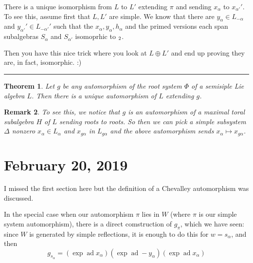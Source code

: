 \documentclass[12pt]{article}
\theoremstyle{nonumberbreak}
\theoremstyle{changebreak}
\newtheorem{thm}{Theorem}[subsection]
\theoremstyle{nonumberbreak}
\theoremstyle{change}
\newtheorem{rmk}[thm]{Remark}
\newcommand*{\brk}{
\rule{2in}{.1pt}
}
\let\sl\relax
\DeclareMathOperator{\sl}{\mathfrak{sl}}
\DeclareMathOperator{\ad}{ad}
\begin{document}
There is a unique isomorphism from $L$ to $L'$ extending $\pi$ and sending $x_\alpha$ to $x_{\alpha'}'$. To
see this, assume first that $L,L'$ are simple. We know that there are $y_\alpha\in L_{-\alpha}$ and 
$y_{\alpha'}'\in L_{-\alpha'}'$ such that the $x_\alpha,y_\alpha,h_\alpha$ and the primed 
versions each span subalgebras $S_\alpha$ and $S_{\alpha'}$ isomoprhic to $\sl_2$.

Then you have this nice trick where you look at $L\oplus L'$ and end up proving they are, in fact, isomorphic. :)

\brk

\begin{thm}
	Let $g$ be any automorphism of the root system $\Phi$ of a semisiple Lie algebra $L$.
	Then there is a unique automorphism of $L$ extending $g$.
\end{thm}
\begin{rmk}
	To see this, we notice that $g$ is an automorphism of a maximal toral subalgebra 
	$H$ of $L$ sending roots to roots. So then we can pick a simple subsystem $\Delta$
	nonzero $x_\alpha\in L_\alpha$ and $x_{g\alpha}$ in $L_{g\alpha}$ and the above automorphism
	sends $x_\alpha\mapsto x_{g\alpha}$.
\end{rmk}

\section{February 20, 2019}
I missed the first section here but the definition of a Chevalley automorphism was discussed.

In the special case when our automorphism $\pi$ lies in $W$ (where $\pi$ is our simple system automorphism), 
there is a direct comstruction of $g_\pi$, which we have seen: since $W$ is generated by simple reflections,
it is enough to do this for $w=s_\alpha$, and then
\[g_{s_\alpha}=(\exp\ad x_\alpha)(\exp\ad -y_\alpha)(\exp\ad x_\alpha)\]
\end{document}
